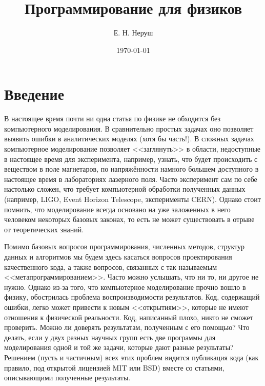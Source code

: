 \documentclass{book}
\begin{document}
\title{Программирование для физиков}

\date{\today}
\author{Е. Н. Неруш}


\maketitle

\tableofcontents

\section{Введение}

В настоящее время почти ни одна статья по физике не обходится без компьютерного моделирования. В
сравнительно простых задачах оно позволяет выявить ошибки в аналитических моделях (хотя бы часть!).
В сложных задачах компьютерное моделирование позволяет <<заглянуть>> в области, недоступные в
настоящее время для эксперимента, например, узнать, что будет происходить с веществом в поле
магнетаров, по напряжённости намного большем доступного в настоящее время в лабораториях лазерного
поля. Часто эксперимент сам по себе настолько сложен, что требует компьютерной обработки
полученных данных (например, LIGO,  Event Horizon Telescope, эксперименты CERN). Однако стоит
помнить, что моделирование всегда основано на уже заложенных в него человеком некоторых базовых
законах, то есть не может существовать в отрыве от теоретических знаний.

Помимо базовых вопросов программирования, численных методов, структур данных и алгоритмов мы будем
здесь касаться вопросов проектирования качественного кода, а также вопросов, связанных с так
называемым <<метапрограммированием>>. Часто можно услышать, что ни то, ни другое не нужно. Однако
из-за того, что компьютерное моделирование прочно вошло в физику, обострилась проблема
воспроизводимости результатов. Код, содержащий ошибки, легко может привести к новым <<открытиям>>,
которые не имеют отношения к физической реальности. Код, написанный плохо, никто не сможет
проверить. Можно ли доверять результатам, полученным с его помощью? Что делать, если у двух разных
научных групп есть две программы для моделирования одной и той же задачи, которые дают разные
результаты? Решением (пусть и частичным) всех этих проблем видится публикация кода (как правило,
под открытой лицензией MIT или BSD) вместе со статьями, описывающими полученные результаты.
\end{document}
